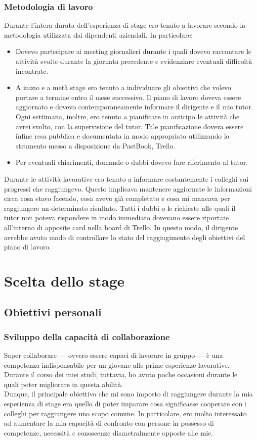 		\subsubsection{Metodologia di lavoro}
			Durante l'intera durata dell'esperienza di stage ero tenuto a lavorare secondo la metodologia utilizzata dai dipendenti
			aziendali. In particolare:
			\begin{itemize}
				\item Dovevo partecipare ai meeting giornalieri durante i quali dovevo raccontare le attività svolte durante la
				giornata precedente e evidenziare eventuali difficoltà incontrate.
				\item A inizio e a metà stage ero tenuto a individuare gli obiettivi che volevo portare a termine entro il
				mese successivo. Il piano di lavoro doveva essere aggiornato e dovevo contemporaneamente informare il dirigente e il
				mio tutor. Ogni settimana, inoltre, ero tenuto a pianificare in anticipo le attività che avrei svolto, con la
				supervisione del tutor. Tale pianificazione doveva essere infine resa pubblica e documentata in modo appropriato
				utilizzando lo strumento messo a disposizione da PastBook, Trello.
				\item Per eventuali chiarimenti, domande o dubbi dovevo fare riferimento al tutor.
			\end{itemize}
			Durante le attività lavorative ero tenuto a informare costantemente i colleghi sui progressi che raggiungevo. Questo
			implicava mantenere aggiornate le informazioni circa cosa stavo facendo, cosa avevo già completato e cosa mi mancava
			per raggiungere un determinato risultato. Tutti i dubbi o le richieste alle quali il tutor non poteva rispondere in modo
			immediato dovevano essere riportate all'interno di apposite card nella board di Trello. In questo modo, il dirigente avrebbe
			avuto modo di controllare lo stato del raggiugimento degli obiettivi del piano di lavoro.
	\section{Scelta dello stage}
		\subsection{Obiettivi personali}
			\subsubsection{Sviluppo della capacità di collaborazione}
				Saper collaborare — ovvero essere capaci di lavorare in gruppo — è una competenza indispensabile per un giovane alle
				prime esperienze lavorative. Durante il corso dei miei studi, tuttavia, ho avuto poche occasioni durante le quali
				poter migliorare in questa abilità.\\
				Dunque, il principale obiettivo che mi sono imposto di raggiungere durante la mia esperienza di stage era quello di
				poter imparare cosa significasse cooperare con i colleghi per raggiungere uno scopo comune. In particolare, ero molto
				interessato ad aumentare la mia capacità di confronto con persone in possesso di competenze, necessità e conoscenze
				diametralmente opposte alle mie.
